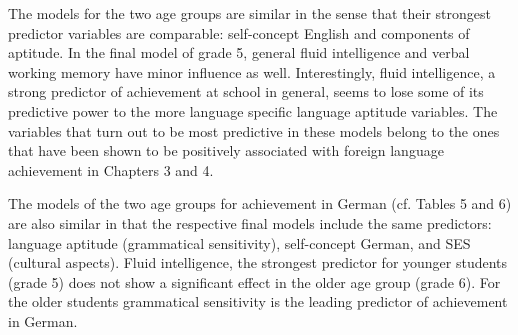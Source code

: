 \documentclass[output=paper]{langsci/langscibook}
\begin{document}
\begin{table}
\caption{Grade 6 – results of the stepwise multiple regression analysis for achievement in English (c-test T3) with predictors T1; $***p<0.001$; $n= 223$. GS: Grammatical sensitivity, SCE: Self-concept English, IA: Inductive ability.}
\end{table}

The models for the two age groups are similar in the sense that their strongest predictor variables are comparable: self-concept English and components of aptitude. In the final model of grade 5, general fluid intelligence and verbal working memory have minor influence as well. Interestingly, fluid intelligence, a strong predictor of achievement at school in general, seems to lose some of its predictive power to the more language specific language aptitude variables. The variables that turn out to be most predictive in these models belong to the ones that have been shown to be positively associated with foreign language achievement in Chapters 3 and 4.

The models of the two age groups for achievement in German (cf. Tables 5 and 6) are also similar in that the respective final models include the same predictors: language aptitude (grammatical sensitivity), self-concept German, and SES (cultural aspects). Fluid intelligence, the strongest predictor for younger students (grade 5) does not show a significant effect in the older age group (grade 6). For the older students grammatical sensitivity is the leading predictor of achievement in German.
\end{document}
